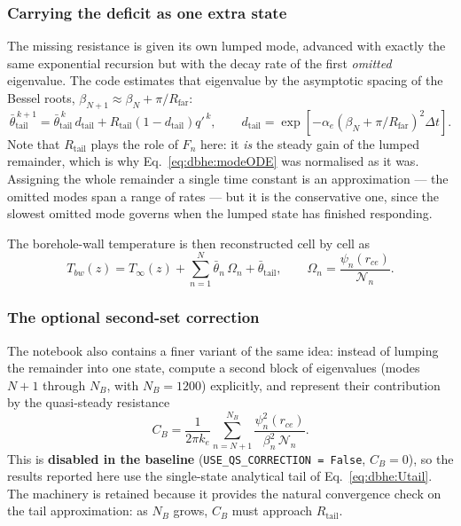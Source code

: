 \subsubsection{Carrying the deficit as one extra state}
The missing resistance is given its own lumped mode, advanced with exactly the
same exponential recursion but with the decay rate of the first \emph{omitted}
eigenvalue. The code estimates that eigenvalue by the asymptotic spacing of the
Bessel roots, $\beta_{N+1}\approx\beta_N+\pi/R_{\mathrm{far}}$:
\begin{equation}
\bar\theta_{\mathrm{tail}}^{\,k+1} =\bar\theta_{\mathrm{tail}}^{\,k}\,d_{\mathrm{tail}}
+R_{\mathrm{tail}}\left(1-d_{\mathrm{tail}}\right)q'^{\,k}, \qquad
d_{\mathrm{tail}}=\exp\!\left[-\alpha_e\left(\beta_N+\pi/R_{\mathrm{far}}\right)^{2}\Delta
t\right].
\label{eq:dbhe:Utail}
\end{equation}
Note that $R_{\mathrm{tail}}$ plays the role of $F_n$ here: it \emph{is} the
steady gain of the lumped remainder, which is why Eq.~\eqref{eq:dbhe:modeODE}
was normalised as it was. Assigning the whole remainder a single time constant
is an approximation --- the omitted modes span a range of rates --- but it is the
conservative one, since the slowest omitted mode governs when the lumped state
has finished responding.

The borehole-wall temperature is then reconstructed cell by cell as
\begin{equation}
T_{bw}(z)=T_\infty(z)+\sum_{n=1}^{N}\bar\theta_n\,\Omega_n +\bar\theta_{\mathrm{tail}},
\qquad \Omega_n=\frac{\psi_n(r_{ce})}{\mathcal{N}_n} .
\label{eq:dbhe:Tbw}
\end{equation}

\subsubsection{The optional second-set correction}
The notebook also contains a finer variant of the same idea: instead of lumping
the remainder into one state, compute a second block of eigenvalues (modes
$N+1$ through $N_B$, with $N_B=1200$) explicitly, and represent their
contribution by the quasi-steady resistance
\begin{equation}
C_B=\frac{1}{2\pi k_e}\sum_{n=N+1}^{N_B}
\frac{\psi_n^{2}(r_{ce})}{\beta_n^{2}\,\mathcal{N}_n} .
\label{eq:dbhe:CB}
\end{equation}
This is \textbf{disabled in the baseline} (\texttt{USE\_QS\_CORRECTION = False},
$C_B=0$), so the results reported here use the single-state analytical tail of
Eq.~\eqref{eq:dbhe:Utail}. The machinery is retained because it provides the
natural convergence check on the tail approximation: as $N_B$ grows, $C_B$ must
approach $R_{\mathrm{tail}}$.

